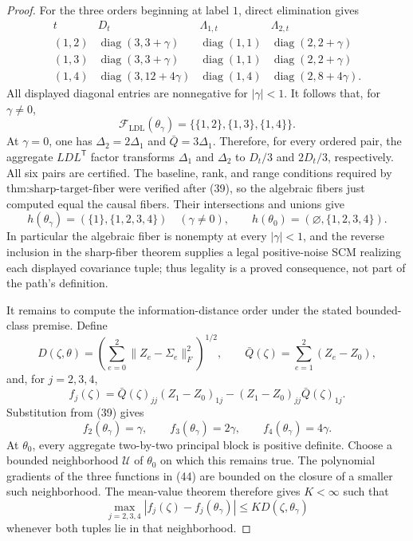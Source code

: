 \documentclass{article}
\begin{document}
\begin{proof}
For the three orders beginning at label \(1\), direct elimination gives
\[
\begin{array}{c|c|c|c}
t&D_t&\Lambda_{1,t}&\Lambda_{2,t}\\ \hline
(1,2)&\operatorname{diag}(3,3+\gamma)&\operatorname{diag}(1,1)&\operatorname{diag}(2,2+\gamma)\\
(1,3)&\operatorname{diag}(3,3+\gamma)&\operatorname{diag}(1,1)&\operatorname{diag}(2,2+\gamma)\\
(1,4)&\operatorname{diag}(3,12+4\gamma)&\operatorname{diag}(1,4)&\operatorname{diag}(2,8+4\gamma).
\end{array} \tag{41}
\]
All displayed diagonal entries are nonnegative for \(|\gamma|<1\).  It follows that, for \(\gamma\ne0\),
\[
 \mathcal F_{\mathrm{LDL}}(\theta_\gamma)
 =\{\{1,2\},\{1,3\},\{1,4\}\}. \tag{42}
\]
At \(\gamma=0\), one has \(\Delta_2=2\Delta_1\) and \(\bar Q=3\Delta_1\).  Therefore, for every ordered pair, the aggregate \(LDL^{\mathsf T}\) factor transforms \(\Delta_1\) and \(\Delta_2\) to \(D_t/3\) and \(2D_t/3\), respectively.  All six pairs are certified.  The baseline, rank, and range conditions required by \(\text{thm:sharp-target-fiber}\) were verified after (39), so the algebraic fibers just computed equal the causal fibers.  Their intersections and unions give
\[
 h(\theta_\gamma)=(\{1\},\{1,2,3,4\})\quad(\gamma\ne0),
 \qquad
 h(\theta_0)=(\varnothing,\{1,2,3,4\}). \tag{43}
\]
In particular the algebraic fiber is nonempty at every \(|\gamma|<1\), and the reverse inclusion in the sharp-fiber theorem supplies a legal positive-noise SCM realizing each displayed covariance tuple; thus legality is a proved consequence, not part of the path's definition.

It remains to compute the information-distance order under the stated bounded-class premise.  Define
\[
 D(\zeta,\theta)=\left(\sum_{e=0}^2\lVert Z_e-\Sigma_e\rVert_F^2\right)^{1/2},
 \qquad
 \bar Q(\zeta)=\sum_{e=1}^2(Z_e-Z_0),
\]
and, for \(j=2,3,4\),
\[
 f_j(\zeta)=\bar Q(\zeta)_{jj}(Z_1-Z_0)_{1j}
 -(Z_1-Z_0)_{jj}\bar Q(\zeta)_{1j}. \tag{44}
\]
Substitution from (39) gives
\[
 f_2(\theta_\gamma)=\gamma,\qquad
 f_3(\theta_\gamma)=2\gamma,\qquad
 f_4(\theta_\gamma)=4\gamma. \tag{45}
\]
At \(\theta_0\), every aggregate two-by-two principal block is positive definite.  Choose a bounded neighborhood \(\mathcal U\) of \(\theta_0\) on which this remains true.  The polynomial gradients of the three functions in (44) are bounded on the closure of a smaller such neighborhood.  The mean-value theorem therefore gives \(K<\infty\) such that
\[
 \max_{j=2,3,4}|f_j(\zeta)-f_j(\theta_\gamma)|
 \le K D(\zeta,\theta_\gamma) \tag{46}
\]
whenever both tuples lie in that neighborhood.


\end{proof}
\end{document}
